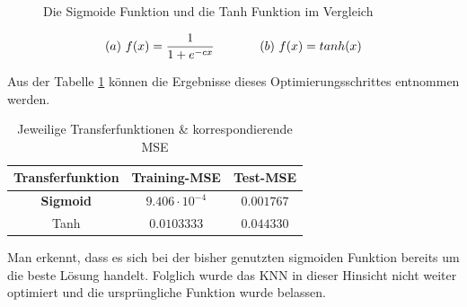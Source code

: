 \begin{figure}[H]
\hfill
{}
\hfill
{}
\hfill
\caption{Die Sigmoide Funktion und die Tanh Funktion im Vergleich}
\label{fig:sigtanh}
\end{figure}

\begin{equation}\formelentry{Sigmoide Funktion sowie Tanh Funktion}
(a)\ f(x)= \frac{1}{1+e^{-cx}}\ \ \ \ \ \ \ \ \ \ \ (b)\ f(x)= tanh(x)
\end{equation}


Aus der Tabelle \ref{tab:TRANSMSE} können die Ergebnisse dieses Optimierungsschrittes entnommen werden.


\begin{table}[H]
  \centering
  \begin{tabular}{|c|c|c|}
  \hline 
  \rule[0ex]{0pt}{2.5ex} Transferfunktion & Training-MSE & Test-MSE \\ 
  \hline 
  \rule[0ex]{0pt}{2.5ex} \textbf{Sigmoid} & $9.406 \cdot 10^{-4}$ & $0.001767$\\ 
  \hline 
  \rule[0ex]{0pt}{2.5ex} Tanh & $0.0103333$ & $0.044330$ \\ 
  \hline 
  \end{tabular} 
  \caption{Jeweilige Transferfunktionen \& korrespondierende MSE}
  \label{tab:TRANSMSE}
\end{table}

Man erkennt, dass es sich bei der bisher genutzten sigmoiden Funktion bereits um die beste Lösung handelt. Folglich wurde das KNN in dieser Hinsicht nicht weiter optimiert und die ursprüngliche Funktion wurde belassen.

